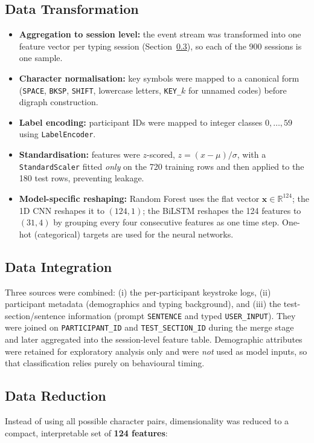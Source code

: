 \subsection{Data Transformation}
\label{subsec:transformation}
\begin{itemize}
    \item \textbf{Aggregation to session level:} the event stream was transformed into one feature vector per typing session (Section~\ref{subsec:reduction}), so each of the 900 sessions is one sample.
    \item \textbf{Character normalisation:} key symbols were mapped to a canonical form (\texttt{SPACE}, \texttt{BKSP}, \texttt{SHIFT}, lowercase letters, \texttt{KEY\_$k$} for unnamed codes) before digraph construction.
    \item \textbf{Label encoding:} participant IDs were mapped to integer classes $0,\dots,59$ using \texttt{LabelEncoder}.
    \item \textbf{Standardisation:} features were $z$-scored, $z=(x-\mu)/\sigma$, with a \texttt{StandardScaler} fitted \emph{only} on the 720 training rows and then applied to the 180 test rows, preventing leakage.
    \item \textbf{Model-specific reshaping:} Random Forest uses the flat vector $\mathbf{x}\in\mathbb{R}^{124}$; the 1D CNN reshapes it to $(124,1)$; the BiLSTM reshapes the 124 features to $(31,4)$ by grouping every four consecutive features as one time step. One-hot (categorical) targets are used for the neural networks.
\end{itemize}

\subsection{Data Integration}
\label{subsec:integration}
Three sources were combined: (i) the per-participant keystroke logs, (ii) participant metadata (demographics and typing background), and (iii) the test-section/sentence information (prompt \texttt{SENTENCE} and typed \texttt{USER\_INPUT}). They were joined on \texttt{PARTICIPANT\_ID} and \texttt{TEST\_SECTION\_ID} during the merge stage and later aggregated into the session-level feature table. Demographic attributes were retained for exploratory analysis only and were \emph{not} used as model inputs, so that classification relies purely on behavioural timing.

\subsection{Data Reduction}
\label{subsec:reduction}
Instead of using all possible character pairs, dimensionality was reduced to a compact, interpretable set of \textbf{124 features}:

